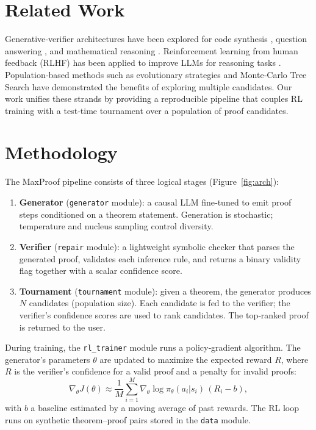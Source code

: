 \documentclass[11pt,a4paper]{article}
\begin{document}
\section{Related Work}
Generative‑verifier architectures have been explored for code synthesis \citep{chen2021evaluating}, question answering \citep{nakano2021self}, and mathematical reasoning \citep{cobbe2021training}.  Reinforcement learning from human feedback (RLHF) has been applied to improve LLMs for reasoning tasks \citep{ouyang2022training}.  Population‑based methods such as evolutionary strategies \citep{salimans2017evolution} and Monte‑Carlo Tree Search \citep{silver2016mastering} have demonstrated the benefits of exploring multiple candidates.  Our work unifies these strands by providing a reproducible pipeline that couples RL training with a test‑time tournament over a population of proof candidates.

\section{Methodology}
The MaxProof pipeline consists of three logical stages (Figure~\ref{fig:arch}):

\begin{enumerate}
    \item \textbf{Generator} (\texttt{generator} module): a causal LLM fine‑tuned to emit proof steps conditioned on a theorem statement.  Generation is stochastic; temperature and nucleus sampling control diversity.
    \item \textbf{Verifier} (\texttt{repair} module): a lightweight symbolic checker that parses the generated proof, validates each inference rule, and returns a binary validity flag together with a scalar confidence score.
    \item \textbf{Tournament} (\texttt{tournament} module): given a theorem, the generator produces $N$ candidates (population size).  Each candidate is fed to the verifier; the verifier’s confidence scores are used to rank candidates.  The top‑ranked proof is returned to the user.
\end{enumerate}

During training, the \texttt{rl\_trainer} module runs a policy‑gradient algorithm.  The generator’s parameters $\theta$ are updated to maximize the expected reward $R$, where $R$ is the verifier’s confidence for a valid proof and a penalty for invalid proofs:
\[
    \nabla_\theta J(\theta) \approx \frac{1}{M}\sum_{i=1}^{M}\nabla_\theta \log \pi_\theta(a_i|s_i)\, (R_i - b),
\]
with $b$ a baseline estimated by a moving average of past rewards.  The RL loop runs on synthetic theorem–proof pairs stored in the \texttt{data} module.
\end{document}
